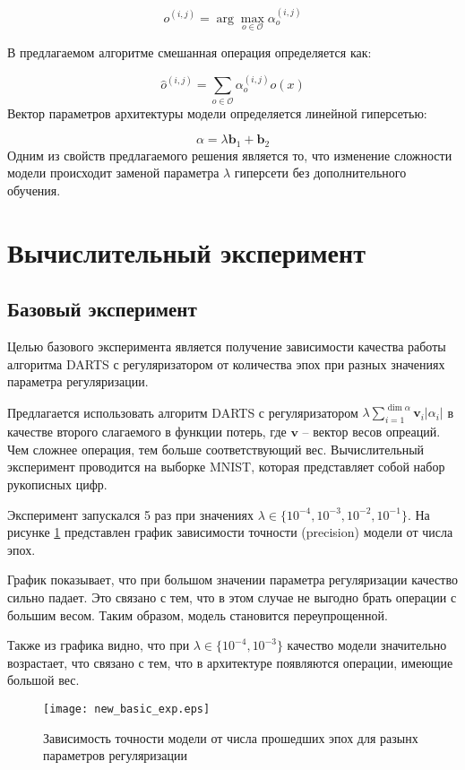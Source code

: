 \documentclass[12pt, twoside]{article}
\begin{document}
$$o^{(i, j)} =\arg\max_{o\in\mathcal{O}}\alpha_o^{(i, j)}$$

В предлагаемом алгоритме смешанная операция определяется как:
 
 $$\hat{o}^{(i, j)} = \sum_{o\in \mathcal{O}}\alpha^{(i, j)}_oo(x)$$
Вектор параметров архитектуры модели определяется линейной гиперсетью:

$$\alpha = \lambda\mathbf{b}_1 + \mathbf{b}_2$$
Одним из свойств предлагаемого решения является то, что изменение сложности модели происходит заменой параметра $\lambda$ гиперсети без дополнительного обучения.


 
 \section{Вычислительный эксперимент}
 
 \subsection{Базовый эксперимент}
 Целью базового эксперимента является получение зависимости качества работы алгоритма DARTS с регуляризатором от количества эпох при разных значениях параметра регуляризации.
 
 Предлагается использовать алгоритм DARTS с регуляризатором $\lambda\sum_{i=1}^{\dim\alpha}\mathbf{v}_i|\alpha_i|$ в качестве второго слагаемого в функции потерь, где $\mathbf{v}$ -- вектор весов опреаций. Чем сложнее операция, тем больше соответствующий вес. Вычислительный эксперимент проводится на выборке MNIST\cite{lecun-mnisthandwrittendigit-2010}, которая представляет собой набор рукописных цифр.
 
Эксперимент запускался 5 раз при значениях $\lambda \in \{10^{-4}, 10^{-3}, 10^{-2}, 10^{-1}\}$. На рисунке \ref{fig:basic_exp} представлен график зависимости точности (precision) модели от числа эпох.

График показывает, что при большом значении параметра регуляризации качество сильно падает. Это связано с тем, что в этом случае не выгодно брать операции с большим весом. Таким образом, модель становится переупрощенной.

 Также из графика видно, что при $\lambda \in \{10^{-4}, 10^{-3}\}$ качество модели значительно возрастает, что связано с тем, что в архитектуре появляются операции, имеющие большой вес.

\begin{figure}[H]
\centering
  \texttt{[image: new\_basic\_exp.eps]}
  \caption{Зависимость точности модели от числа прошедших эпох для разынх параметров регуляризации}
  \label{fig:basic_exp}
\end{figure}
\end{document}
